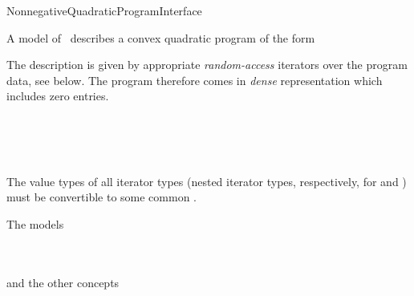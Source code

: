 \begin{ccRefConcept}{NonnegativeQuadraticProgramInterface}

\ccDefinition
A model of \ccRefName\ describes a convex quadratic program of the form


The description is given by appropriate \emph{random-access} 
iterators over the program data, see below. The program therefore 
comes in \emph{dense} representation which includes zero entries.

\ccHasModels
{}\\
\\
\\

\ccTypes







\ccOperations








\ccRequirements

The value types of all iterator types (nested iterator types,
respectively, for  and ) must be
convertible to some common  .

\ccSeeAlso
The models

\\
\\
and the other concepts

\\
\\
\end{ccRefConcept}
